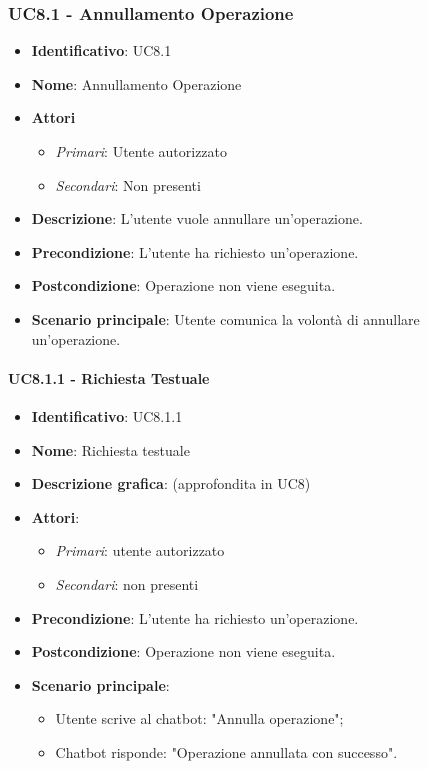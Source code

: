 \subsubsection{UC8.1 - Annullamento Operazione}
\begin{itemize}
  \item \textbf{Identificativo}: UC8.1
  \item \textbf{Nome}: Annullamento Operazione 
  \item \textbf{Attori}
  \begin{itemize} 
    \item \textit{Primari}: Utente autorizzato
    \item \textit{Secondari}: Non presenti
  \end{itemize}
  \item \textbf{Descrizione}: L'utente vuole annullare un'operazione.
  \item \textbf{Precondizione}: L'utente ha richiesto un'operazione.
  \item \textbf{Postcondizione}: Operazione non viene eseguita.
  \item \textbf{Scenario principale}: Utente comunica la volontà di annullare un'operazione.
\end{itemize}

\paragraph{UC8.1.1 - Richiesta Testuale}
\begin{itemize}
   \item \textbf{Identificativo}: UC8.1.1
   \item \textbf{Nome}: Richiesta testuale
   \item \textbf{Descrizione grafica}: (approfondita in UC8)
   \item \textbf{Attori}:
   \begin{itemize} 
       \item \textit{Primari}: utente autorizzato
       \item \textit{Secondari}: non presenti
   \end{itemize}
       \item \textbf{Precondizione}: L'utente ha richiesto un'operazione.
       \item \textbf{Postcondizione}: Operazione non viene eseguita. 
    \item \textbf{Scenario principale}: 
       \begin{itemize}
        \item Utente scrive al chatbot: "Annulla operazione";
        \item Chatbot risponde: "Operazione annullata con successo".
       \end{itemize}
\end{itemize}

